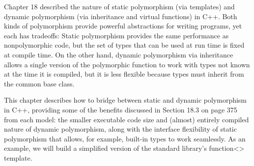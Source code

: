 Chapter 18 described the nature of static polymorphism (via templates) and dynamic polymorphism (via inheritance and virtual functions) in C++. Both kinds of polymorphism provide powerful abstractions for writing programs, yet each has tradeoffs: Static polymorphism provides the same performance as nonpolymorphic code, but the set of types that can be used at run time is fixed at compile time. On the other hand, dynamic polymorphism via inheritance allows a single version of the polymorphic function to work with types not known at the time it is compiled, but it is less flexible because types must inherit from the common base class.

This chapter describes how to bridge between static and dynamic polymorphism in C++, providing some of the benefits discussed in Section 18.3 on page 375 from each model: the smaller executable code size and (almost) entirely compiled nature of dynamic polymorphism, along with the interface flexibility of static polymorphism that allows, for example, built-in types to work seamlessly. As an example, we will build a simplified version of the standard library’s function<> template.